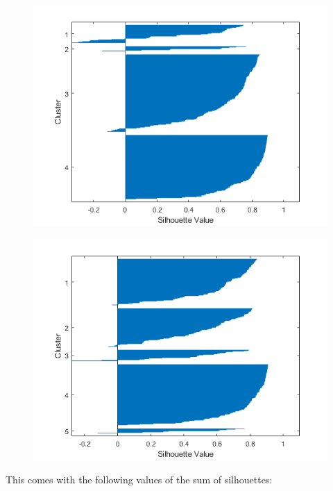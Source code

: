\documentclass[sn-mathphys,Numbered]{sn-jnl}
\begin{document}
\begin{figure}[H]
\centering
\begin{minipage}{.5\textwidth}
  \centering
  \includegraphics[width=\linewidth]{silhouette_means_4}
  \label{fig:test1}
\end{minipage}%
\begin{minipage}{.5\textwidth}
  \centering
  \includegraphics[width=\linewidth]{silhouette_means_5}
  \label{fig:test2}
\end{minipage}
\end{figure}

This comes with the following values of the sum of silhouettes:
\end{document}

